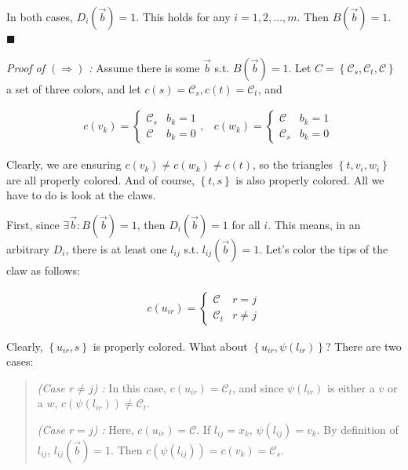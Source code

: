 \documentclass[a4paper, 12pt]{article}
\begin{document}
In both cases, $D_i(\overrightarrow{b}) = 1$. This holds for any $i = 1, 2,
\ldots, m$. Then $B(\overrightarrow{b}) = 1$. $\blacksquare$

\textit{Proof of $(\Rightarrow)$ :} Assume there is some $\overrightarrow{b}$
s.t. $B(\overrightarrow{b}) = 1$. Let $C = \left\{ \mathcal{C}_s,
\mathcal{C}_t, \mathcal{C} \right\} $ a set of three colors, and let $c(s) =
\mathcal{C}_s, c(t) = \mathcal{C}_t$, and 

\begin{align*}
    &c(v_k) = \begin{cases}
        \mathcal{C}_s & b_k = 1 \\ 
        \mathcal{C} & b_k = 0
    \end{cases}, &c(w_k) = \begin{cases}
    \mathcal{C} & b_k = 1 \\ 
    \mathcal{C}_s & b_k = 0
    \end{cases}
\end{align*}

Clearly, we are ensuring $c(v_k) \neq c(w_k) \neq c(t)$, so the triangles
$\left\{ t, v_i, w_i \right\} $ are all properly colored. And of course,
$\left\{ t, s \right\} $ is also properly colored. All we have to do is look at
the claws.

First, since $\exists \overrightarrow{b} : B(\overrightarrow{b}) = 1$, then
$D_i(\overrightarrow{b}) = 1$ for all $i$. This means, in an arbitrary $D_i$,
there is at least one $l_{ij}$ s.t. $l_{ij}(\overrightarrow{b}) = 1$. Let's 
color the tips of the claw as follows:

\begin{align*}
    c(u_{ir}) = \begin{cases}
        \mathcal{C} & r = j \\ 
        \mathcal{C}_t & r \neq j
    \end{cases}
\end{align*}

Clearly, $\left\{ u_{ir}, s \right\} $ is properly colored. What about $\left\{ u_{ir}, \psi(l_{ir}) \right\} $? There are two cases: 

\begin{quote}
    \textit{(Case $r \neq j$) :} In this case, $c(u_{ir}) = \mathcal{C}_t$, and since $\psi(l_{ir})$ is either a $v$ or a $w$, $c(\psi(l_{ir})) \neq \mathcal{C}_t$. 

    \textit{(Case $r = j$) :} Here, $c(u_{ir}) = \mathcal{C}$. If $l_{ij} = x_k$, $\psi(l_{ij}) = v_k$. By definition of $l_{ij}$, $l_{ij}(\overrightarrow{b}) = 1$. Then $c(\psi(l_{ij})) = c(v_k) = \mathcal{C}_s$. 
\end{quote}
\end{document}
